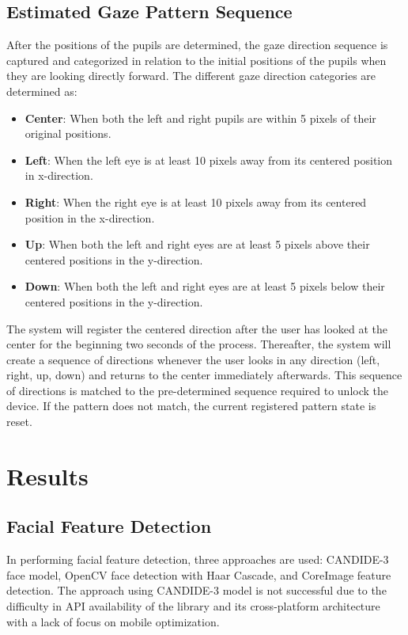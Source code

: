 \documentclass[10pt,twocolumn,letterpaper]{article}
\begin{document}
\subsection{Estimated Gaze Pattern Sequence}
After the positions of the pupils are determined, the gaze direction sequence is captured and categorized in relation to the initial positions of the pupils when they are looking directly forward.  The different gaze direction categories are determined as:
\begin{itemize}
\item \textbf{Center}: When both the left and right pupils are within 5 pixels of their original positions.
\item \textbf{Left}: When the left eye is at least 10 pixels away from its centered position in x-direction.
\item \textbf{Right}: When the right eye is at least 10 pixels away from its centered position in the x-direction.
\item \textbf{Up}: When both the left and right eyes are at least 5 pixels above their centered positions in the y-direction.
\item \textbf{Down}: When both the left and right eyes are at least 5 pixels below their centered positions in the y-direction.
\end{itemize}

The system will register the centered direction after the user has looked at the center for the beginning two seconds of the process.  Thereafter, the system will create a sequence of directions whenever the user looks in any direction (left, right, up, down) and returns to the center immediately afterwards.  This sequence of directions is matched to the pre-determined sequence required to unlock the device.  If the pattern does not match, the current registered pattern state is reset.

\section{Results}
\subsection{Facial Feature Detection}
In performing facial feature detection, three approaches are used: CANDIDE-3 face model, OpenCV face detection with Haar Cascade, and CoreImage feature detection.  The approach using CANDIDE-3 model is not successful due to the difficulty in API availability of the library and its cross-platform architecture with a lack of focus on mobile optimization.
\end{document}
